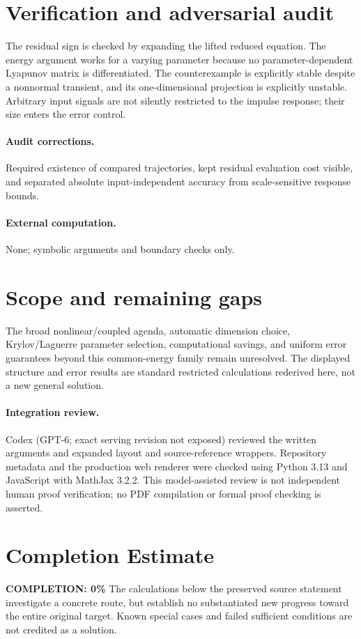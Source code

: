 \documentclass[11pt]{article}
\begin{document}
\section{Verification and adversarial audit}
The residual sign is checked by expanding the lifted reduced equation. The energy argument works for a varying parameter because no parameter-dependent Lyapunov matrix is differentiated. The counterexample is explicitly stable despite a nonnormal transient, and its one-dimensional projection is explicitly unstable. Arbitrary input signals are not silently restricted to the impulse response; their size enters the error control.
\paragraph{Audit corrections.} Required existence of compared trajectories, kept residual evaluation cost visible, and separated absolute input-independent accuracy from scale-sensitive response bounds.
\paragraph{External computation.} None; symbolic arguments and boundary checks only.
\section{Scope and remaining gaps}
The broad nonlinear/coupled agenda, automatic dimension choice, Krylov/Laguerre parameter selection, computational savings, and uniform error guarantees beyond this common-energy family remain unresolved. The displayed structure and error results are standard restricted calculations rederived here, not a new general solution.
\paragraph{Integration review.} Codex (GPT-6; exact serving revision not exposed) reviewed the written arguments and expanded layout and source-reference wrappers. Repository metadata and the production web renderer were checked using Python 3.13 and JavaScript with MathJax 3.2.2. This model-assisted review is not independent human proof verification; no PDF compilation or formal proof checking is asserted.

\section{Completion Estimate}
\noindent\textbf{COMPLETION: 0\%}
The calculations below the preserved source statement investigate a concrete route,
but establish no substantiated new progress toward the entire original target.
Known special cases and failed sufficient conditions are not credited as a solution.
\end{document}
